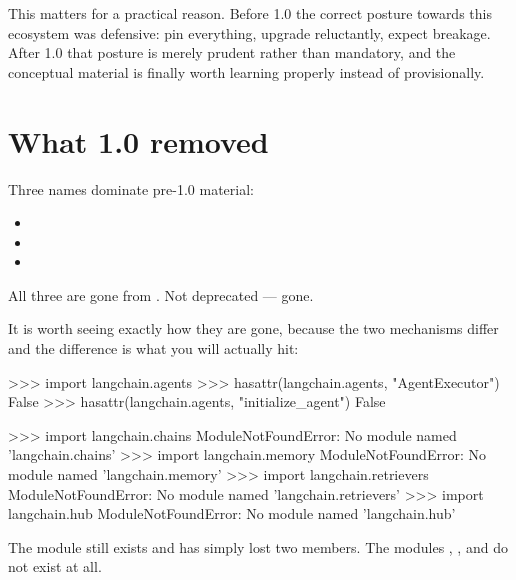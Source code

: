 This matters for a practical reason. Before 1.0 the correct posture towards this
ecosystem was defensive: pin everything, upgrade reluctantly, expect breakage.
After 1.0 that posture is merely prudent rather than mandatory, and the
conceptual material is finally worth learning properly instead of provisionally.

\section{What 1.0 removed}
\label{sec:removed}

Three names dominate pre-1.0 material:

\begin{itemize}[leftmargin=1.4em,nosep]
\item {}
\item {}
\item {}
\end{itemize}

\medskip
\noindent
All three are gone from . Not deprecated --- gone.

It is worth seeing exactly how they are gone, because the two mechanisms differ
and the difference is what you will actually hit:

\begin{python}[caption={What is left of the pre-1.0 API in \pkg{langchain} 1.3.14}, label={lst:removed}]
>>> import langchain.agents
>>> hasattr(langchain.agents, "AgentExecutor")
False
>>> hasattr(langchain.agents, "initialize_agent")
False

>>> import langchain.chains
ModuleNotFoundError: No module named 'langchain.chains'
>>> import langchain.memory
ModuleNotFoundError: No module named 'langchain.memory'
>>> import langchain.retrievers
ModuleNotFoundError: No module named 'langchain.retrievers'
>>> import langchain.hub
ModuleNotFoundError: No module named 'langchain.hub'
\end{python}

The module  still exists and has simply lost two members.
The modules , ,
 and  do not exist at all.

